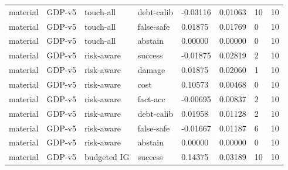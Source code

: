 \documentclass{article}
\begin{document}
\begin{center}
\begin{longtable}{llllllll}
material & GDP-v5 & touch-all & debt-calib & -0.03116 & 0.01063 & 10 & 10 \\
material & GDP-v5 & touch-all & false-safe & 0.01875 & 0.01769 & 0 & 10 \\
material & GDP-v5 & touch-all & abstain & 0.00000 & 0.00000 & 0 & 10 \\
material & GDP-v5 & risk-aware & success & -0.01875 & 0.02819 & 2 & 10 \\
material & GDP-v5 & risk-aware & damage & 0.01875 & 0.02060 & 1 & 10 \\
material & GDP-v5 & risk-aware & cost & 0.10573 & 0.00468 & 0 & 10 \\
material & GDP-v5 & risk-aware & fact-acc & -0.00695 & 0.00837 & 2 & 10 \\
material & GDP-v5 & risk-aware & debt-calib & 0.01958 & 0.01128 & 2 & 10 \\
material & GDP-v5 & risk-aware & false-safe & -0.01667 & 0.01187 & 6 & 10 \\
material & GDP-v5 & risk-aware & abstain & 0.00000 & 0.00000 & 0 & 10 \\
material & GDP-v5 & budgeted IG & success & 0.14375 & 0.03189 & 10 & 10 \\
\bottomrule
\end{longtable}
\renewcommand{\arraystretch}{1.0}
\end{center}
\end{document}
